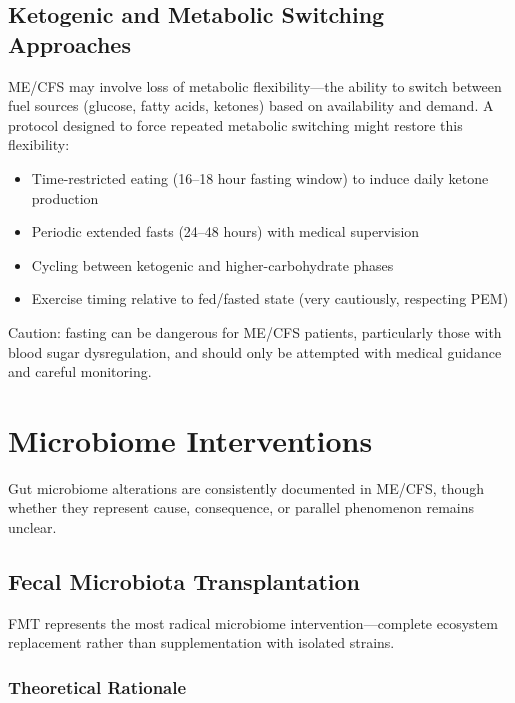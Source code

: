 \subsection{Ketogenic and Metabolic Switching Approaches}

\begin{hypothesis}
ME/CFS may involve loss of metabolic flexibility---the ability to switch between fuel sources (glucose, fatty acids, ketones) based on availability and demand. A protocol designed to force repeated metabolic switching might restore this flexibility:
\begin{itemize}
    \item Time-restricted eating (16--18 hour fasting window) to induce daily ketone production
    \item Periodic extended fasts (24--48 hours) with medical supervision
    \item Cycling between ketogenic and higher-carbohydrate phases
    \item Exercise timing relative to fed/fasted state (very cautiously, respecting PEM)
\end{itemize}
Caution: fasting can be dangerous for ME/CFS patients, particularly those with blood sugar dysregulation, and should only be attempted with medical guidance and careful monitoring.
\end{hypothesis}

\section{Microbiome Interventions}
\label{sec:microbiome-interventions}

Gut microbiome alterations are consistently documented in ME/CFS, though whether they represent cause, consequence, or parallel phenomenon remains unclear.

\subsection{Fecal Microbiota Transplantation}

FMT represents the most radical microbiome intervention---complete ecosystem replacement rather than supplementation with isolated strains.

\subsubsection{Theoretical Rationale}

